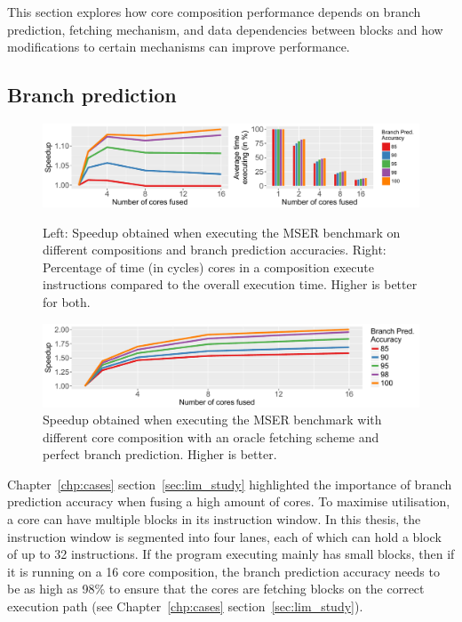 This section explores how core composition performance depends on branch prediction, fetching mechanism, and data dependencies between blocks and how modifications to certain mechanisms can improve performance.
\vspace{-1em}
\subsection{Branch prediction}
\begin{figure}[t]
    \centering
    \includegraphics[width=1\textwidth]{chapter3/graphics/motiv_p1.pdf}
    \caption{Left: Speedup obtained when executing the MSER benchmark on different compositions and branch prediction accuracies.
	Right: Percentage of time (in cycles) cores in a composition execute instructions compared to the overall execution time. Higher is better for both.}
    \label{fig:mser_motiv}
    \centering
    \includegraphics[width=1\textwidth]{chapter3/graphics/perfect_fetch_motiv2.pdf}
    \caption{Speedup obtained when executing the MSER benchmark with different core composition with an oracle fetching scheme and perfect branch prediction. Higher is better. }
    \label{fig:motivation_fetch}
	\vspace{1em}
\end{figure}
Chapter~\ref{chp:cases} section~\ref{sec:lim_study} highlighted the importance of branch prediction accuracy when fusing a high amount of cores.
To maximise utilisation, a core can have multiple blocks in its instruction window.
In this thesis, the instruction window is segmented into four lanes, each of which can hold a block of up to 32 instructions.
If the program executing mainly has small blocks, then if it is running on a 16 core composition, the branch prediction accuracy needs to be as high as 98\% to ensure that the cores are fetching blocks on the correct execution path (see Chapter~\ref{chp:cases} section~\ref{sec:lim_study}).

